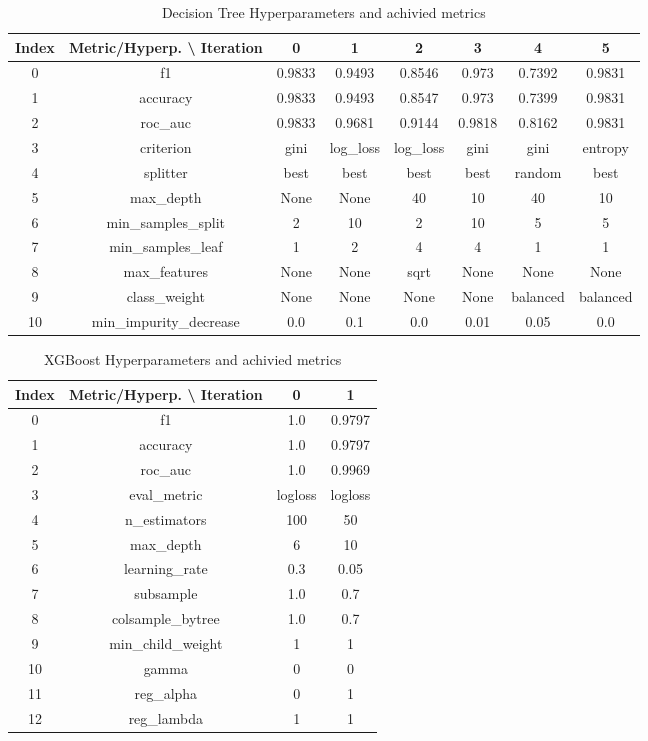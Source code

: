 \documentclass{article}%
\begin{document}
\begin{table}[h!]%
\caption{Decision Tree Hyperparameters and achivied metrics}%
\vspace{0.2cm}%
\centering%
\begin{tabular}{|c||c||c||c||c||c||c||c|}%
\hline%
Index&Metric/Hyperp. \textbackslash{} Iteration&0&1&2&3&4&5\\%
\hline%
0&f1&0.9833&0.9493&0.8546&0.973&0.7392&0.9831\\%
1&accuracy&0.9833&0.9493&0.8547&0.973&0.7399&0.9831\\%
2&roc\_auc&0.9833&0.9681&0.9144&0.9818&0.8162&0.9831\\%
3&criterion&gini&log\_loss&log\_loss&gini&gini&entropy\\%
4&splitter&best&best&best&best&random&best\\%
5&max\_depth&None&None&40&10&40&10\\%
6&min\_samples\_split&2&10&2&10&5&5\\%
7&min\_samples\_leaf&1&2&4&4&1&1\\%
8&max\_features&None&None&sqrt&None&None&None\\%
9&class\_weight&None&None&None&None&balanced&balanced\\%
10&min\_impurity\_decrease&0.0&0.1&0.0&0.01&0.05&0.0\\%
\hline%
\end{tabular}%
\end{table}

%


\begin{table}[h!]%
\caption{XGBoost Hyperparameters and achivied metrics}%
\vspace{0.2cm}%
\centering%
\begin{tabular}{|c||c||c||c|}%
\hline%
Index&Metric/Hyperp. \textbackslash{} Iteration&0&1\\%
\hline%
0&f1&1.0&0.9797\\%
1&accuracy&1.0&0.9797\\%
2&roc\_auc&1.0&0.9969\\%
3&eval\_metric&logloss&logloss\\%
4&n\_estimators&100&50\\%
5&max\_depth&6&10\\%
6&learning\_rate&0.3&0.05\\%
7&subsample&1.0&0.7\\%
8&colsample\_bytree&1.0&0.7\\%
9&min\_child\_weight&1&1\\%
10&gamma&0&0\\%
11&reg\_alpha&0&1\\%
12&reg\_lambda&1&1\\%
\hline%
\end{tabular}%
\end{table}
\end{document}
